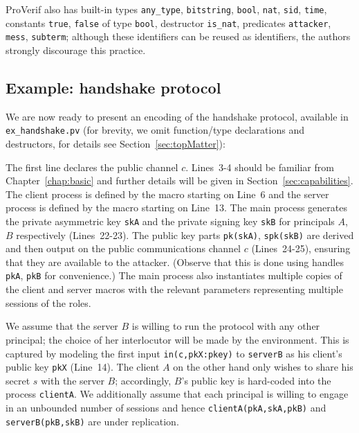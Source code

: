 \documentclass{book}
\newcommand{\tblue}[1]{\textcolor{blue}{REMARK: \emph{#1}}}
\renewcommand{\marginpar}[1]{\tblue{#1}}
\newcommand{\A}{A}
\newcommand{\B}{B}
\begin{document}
\noindent ProVerif also has built-in types \lstinline!any_type!, \lstinline!bitstring!, \lstinline!bool!, \lstinline!nat!, \lstinline!sid!, \lstinline!time!, constants \lstinline!true!, \lstinline!false! of type \lstinline!bool!, destructor \lstinline!is_nat!, predicates \lstinline!attacker!, \lstinline!mess!, \lstinline!subterm!; although these identifiers can be reused as identifiers, the authors strongly discourage this practice.




\subsection{Example: handshake protocol}\label{sec:exampleHandshake}

We are now ready to present an encoding of the handshake protocol, available in \texttt{{\docexdir}ex\_handshake.pv} (for brevity, we omit function/type declarations and destructors, for details see Section~\ref{sec:topMatter}):
%

%
The first line declares the public channel $c$. Lines~3-4 should be familiar from Chapter~\ref{chap:basic} and further details will be given in Section~\ref{sec:capabilities}. The client process is defined by the macro starting on Line~6 and the server process is defined by the macro starting on Line~13.
The main process generates the private asymmetric key \lstinline!skA! and the private signing key \lstinline!skB!
for principals $\A$, $\B$ respectively  (Lines~22-23). The public key parts \lstinline!pk(skA)!,
\lstinline!spk(skB)! are derived and then output on the public communications channel $c$ (Lines~24-25), ensuring that they are available to the attacker.
(Observe that this is done using
handles \lstinline!pkA!, \lstinline!pkB! for convenience.)
The main process also instantiates multiple copies of the client and server macros with the relevant parameters representing multiple sessions of the roles.

We assume that the server $\B$ is willing to run the protocol
with any other principal; the choice of her interlocutor will be made by the
environment. This is captured by modeling the first input \lstinline!in(c,pkX:pkey)!
to \lstinline!serverB! as his client's public key \lstinline!pkX! (Line~14).
The client $\A$ on the other hand only wishes to share his secret $s$ with the server $\B$;
accordingly, $\B$'s public key is hard-coded into the process \lstinline!clientA!.
We additionally assume
that each principal is willing to engage in an unbounded number of
sessions and hence \lstinline!clientA(pkA,skA,pkB)! and \lstinline!serverB(pkB,skB)! are under replication.
\end{document}

